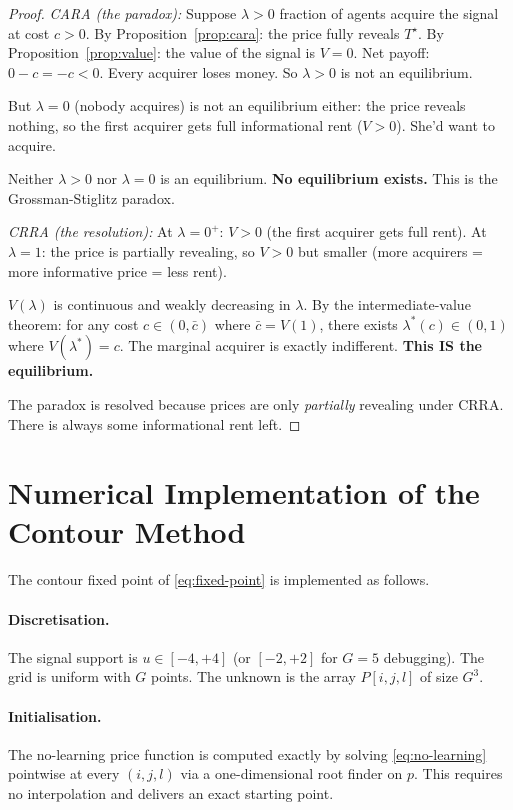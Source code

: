 \documentclass[12pt,letterpaper]{article}
\theoremstyle{definition}
\theoremstyle{remark}
\newcommand{\Tstar}{T^{\!\star}}
\newcommand{\1}{\mathbf{1}}
\begin{document}
\begin{proof}
\emph{CARA (the paradox):}
Suppose $\lambda > 0$ fraction of agents acquire the signal at cost $c > 0$.
By Proposition~\ref{prop:cara}: the price fully reveals $\Tstar$.
By Proposition~\ref{prop:value}: the value of the signal is $V = 0$.
Net payoff: $0 - c = -c < 0$. Every acquirer loses money.
So $\lambda > 0$ is not an equilibrium.

But $\lambda = 0$ (nobody acquires) is not an equilibrium either: the
price reveals nothing, so the first acquirer gets full informational
rent ($V > 0$). She'd want to acquire.

Neither $\lambda > 0$ nor $\lambda = 0$ is an equilibrium.
\textbf{No equilibrium exists.} This is the Grossman-Stiglitz paradox.

\emph{CRRA (the resolution):}
At $\lambda = 0^+$: $V > 0$ (the first acquirer gets full rent).
At $\lambda = 1$: the price is partially revealing, so $V > 0$ but
smaller (more acquirers = more informative price = less rent).

$V(\lambda)$ is continuous and weakly decreasing in $\lambda$.
By the intermediate-value theorem: for any cost $c \in (0, \bar{c})$
where $\bar{c} = V(1)$, there exists $\lambda^*(c) \in (0,1)$
where $V(\lambda^*) = c$. The marginal acquirer is exactly indifferent.
\textbf{This IS the equilibrium.}

The paradox is resolved because prices are only \emph{partially}
revealing under CRRA. There is always some informational rent left.
\end{proof}



\section{Numerical Implementation of the Contour Method}\label{app:contour}\label{app:numerics}

The contour fixed point of \eqref{eq:fixed-point} is implemented as follows.

\paragraph{Discretisation.} The signal support is $u\in[-4,+4]$ (or $[-2,+2]$
for $G=5$ debugging). The grid is uniform with $G$ points. The unknown is
the array $P[i,j,l]$ of size $G^{3}$.

\paragraph{Initialisation.} The no-learning price function is computed
exactly by solving \eqref{eq:no-learning} pointwise at every $(i,j,l)$ via
a one-dimensional root finder on $p$. This requires no interpolation and
delivers an exact starting point.
\end{document}
